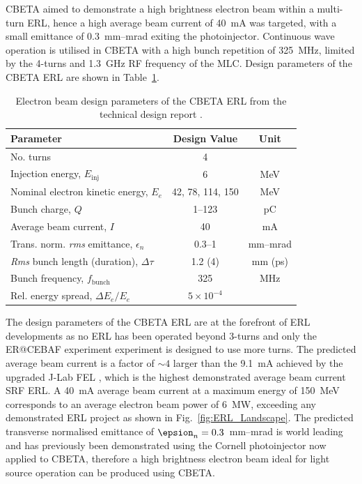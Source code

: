 \documentclass[../main.tex]{subfiles}
\begin{document}
CBETA aimed to demonstrate a high brightness electron beam within a multi-turn ERL, hence a high average beam current of 40~\si{\milli\ampere} was targeted, with a small emittance of 0.3~\si{\milli\meter}--\si{\milli\radian} exiting the photoinjector. Continuous wave operation is utilised in CBETA with a high bunch repetition of 325~\si{\mega\hertz}, limited by the 4-turns and 1.3~\si{\giga\hertz} RF frequency of the MLC. Design parameters of the CBETA ERL \cite{hoffstaetter2017cbeta} are shown in Table~\ref{tab:CBETA_ERL_design_parameters}.
\begin{table}[!h]
\centering
\caption{Electron beam design parameters of the CBETA ERL from the technical design report \cite{hoffstaetter2017cbeta}.}
\vspace{3mm}
\begin{tabular}{lcc}
\hline\hline
Parameter & Design Value & Unit \\
\hline
No. turns & 4 & \\
Injection energy, $E_{\mathrm{inj}}$ & 6 & \si{\mega\electronvolt} \\
Nominal electron kinetic energy, $E_{e}$ & 42, 78, 114, 150 & \si{\mega\electronvolt} \\
Bunch charge, $Q$ & 1--123 & \si{\pico\coulomb} \\
Average beam current, $I$ & 40 & \si{\milli\ampere} \\
Trans. norm. \textit{rms} emittance, $\epsilon_{n}$ & 0.3--1 & \si{\milli\meter}--\si{\milli\radian} \\
\textit{Rms} bunch length (duration), $\Delta\tau$ & 1.2 (4) & \si{\milli\meter} (\si{\pico\second}) \\
Bunch frequency, $f_{\mathrm{bunch}}$ & 325 & \si{\mega\hertz} \\
Rel. energy spread, $\Delta E_{e}/E_{e}$ & $5\times 10^{-4}$ & \\
\hline
\end{tabular}
\label{tab:CBETA_ERL_design_parameters}
\end{table}

The design parameters of the CBETA ERL are at the forefront of ERL developments as no ERL has been operated beyond 3-turns \cite{gavrilov2007status,adolphsen2022european} and only the ER@CEBAF experiment \cite{bogacz2016er,meot2016er} experiment is designed to use more turns. The predicted average beam current is a factor of $\sim4$ larger than the 9.1~\si{\milli\ampere} achieved by the upgraded J-Lab FEL \cite{neil2006jlab}, which is the highest demonstrated average beam current SRF ERL. A 40~\si{\milli\ampere} average beam current at a maximum energy of 150~\si{\mega\electronvolt} corresponds to an average electron beam power of 6~\si{\mega\watt}, exceeding any demonstrated ERL project as shown in Fig.~\ref{fig:ERL_Landscape}. The predicted transverse normalised emittance of $\epsion_{n} = 0.3$~\si{\milli\meter}--\si{\milli\radian} is world leading and has previously been demonstrated using the Cornell photoinjector \cite{bartnik2015operational} now applied to CBETA, therefore a high brightness electron beam ideal for light source operation can be produced using CBETA.  
\end{document}
